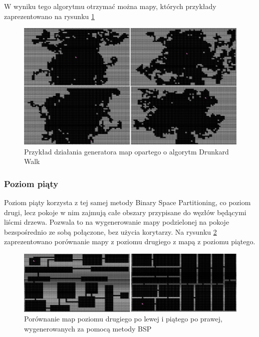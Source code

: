 \documentclass[12pt,twoside]{article}
\begin{document}
W wyniku tego algorytmu otrzymać można mapy, których przykłady zaprezentowano na rysunku \ref{generators:drunkard_walk} 

\FloatBarrier
\begin{figure}[h]
	\centering
	\includegraphics[width=16cm]{images/generators/drunkard_walk.png}
	\caption{Przykład działania generatora map opartego o algorytm Drunkard Walk}
	\label{generators:drunkard_walk}
\end{figure}
\FloatBarrier

\subsubsection{Poziom piąty}
Poziom piąty korzysta z tej samej metody Binary Space Partitioning, co poziom drugi, lecz pokoje w nim zajmują całe obszary przypisane do węzłów będącymi liścmi drzewa. Pozwala to na wygenerowanie mapy podzielonej na pokoje bezspośrednio ze sobą połączone, bez użycia korytarzy. Na rysunku \ref{generators:bsp_diff} zaprezentowano porównanie mapy z poziomu drugiego z mapą z poziomu piątego.
	
\FloatBarrier
\begin{figure}[h]
	\centering
	\includegraphics[width=16cm]{images/generators/bsp_diff.png}
	\caption{Porównanie map poziomu drugiego po lewej i piątego po prawej, wygenerowanych za pomocą metody BSP}
	\label{generators:bsp_diff}
\end{figure}
\FloatBarrier
\end{document}
